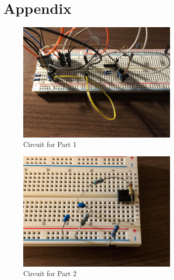 \documentclass[12pt]{article}
\begin{document}
\section*{Appendix}
\begin{figure}[!ht]
    \centering
    \includegraphics[width=0.7\textwidth]{Part1}
    \caption{\label{fig:P1}Circuit for Part 1}
\end{figure}
\begin{figure}[!ht]
    \centering
    \includegraphics[width=0.7\textwidth]{Part2}
    \caption{\label{fig:P2}Circuit for Part 2}
\end{figure}
\end{document}
